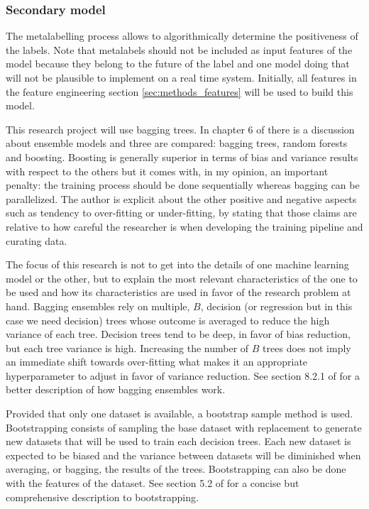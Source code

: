 \subsubsection{Secondary model}
\label{sec:methods_pipeline_secondary_model}

The metalabelling process allows to algorithmically determine the positiveness
of the labels. Note that metalabels should not be included as input features
of the model because they belong to the future of the label and one model doing
that will not be plausible to implement on a real time system.
Initially, all features in the feature engineering section \ref{sec:methods_features}
will be used to build this model.

This research project will use bagging trees. In chapter 6 of \cite{lopez_de_prado}
there is a discussion about ensemble models and three are compared: bagging
trees, random forests and boosting. Boosting is generally superior in terms of
bias and variance results with respect to the others but it comes with, in my
opinion, an important penalty: the training process should be done sequentially whereas
bagging can be parallelized. The author is explicit about the other positive and
negative aspects such as tendency to over-fitting or under-fitting, by stating
that those claims are relative to how careful the researcher is when developing 
the training pipeline and curating data.

The focus of this research is not to get into the details of one machine
learning model or the other, but to explain the most relevant characteristics of
the one to be used and how its characteristics are used in favor of the research
problem at hand. Bagging ensembles rely on multiple, $B$, decision (or
regression but in this case we need decision) trees whose outcome is averaged 
to reduce the high variance of each tree. Decision trees tend to be deep, in
favor of bias reduction, but each tree variance is high. Increasing the number
of $B$ trees does not imply an immediate shift towards over-fitting what makes
it an appropriate hyperparameter to adjust in favor of variance reduction. See
section 8.2.1 of \cite{intro_to_statistical_learning} for a better
description of how bagging ensembles work.

Provided that only one dataset is available, a bootstrap sample method is used.
Bootstrapping consists of sampling the base dataset with replacement to generate
new datasets that will be used to train each decision trees. Each new dataset is
expected to be biased and the variance between datasets will be diminished when
averaging, or bagging, the results of the trees. Bootstrapping can also be done
with the features of the dataset. See section 5.2 of \cite{intro_to_statistical_learning}
for a concise but comprehensive description to bootstrapping.

